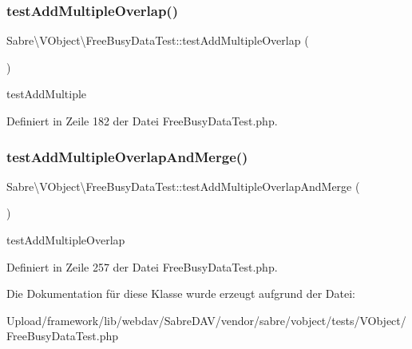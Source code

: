 \subsubsection{\texorpdfstring{test\+Add\+Multiple\+Overlap()}{testAddMultipleOverlap()}}
{\footnotesize\ttfamily Sabre\textbackslash{}\+V\+Object\textbackslash{}\+Free\+Busy\+Data\+Test\+::test\+Add\+Multiple\+Overlap (\begin{DoxyParamCaption}{ }\end{DoxyParamCaption})}

test\+Add\+Multiple 

Definiert in Zeile 182 der Datei Free\+Busy\+Data\+Test.\+php.

\mbox{\label{class_sabre_1_1_v_object_1_1_free_busy_data_test_aaa1aa5a2bc0a760e02a60130a226ebdb}} 
\subsubsection{\texorpdfstring{test\+Add\+Multiple\+Overlap\+And\+Merge()}{testAddMultipleOverlapAndMerge()}}
{\footnotesize\ttfamily Sabre\textbackslash{}\+V\+Object\textbackslash{}\+Free\+Busy\+Data\+Test\+::test\+Add\+Multiple\+Overlap\+And\+Merge (\begin{DoxyParamCaption}{ }\end{DoxyParamCaption})}

test\+Add\+Multiple\+Overlap 

Definiert in Zeile 257 der Datei Free\+Busy\+Data\+Test.\+php.



Die Dokumentation für diese Klasse wurde erzeugt aufgrund der Datei\+:\begin{DoxyCompactItemize}
\item 
Upload/framework/lib/webdav/\+Sabre\+D\+A\+V/vendor/sabre/vobject/tests/\+V\+Object/Free\+Busy\+Data\+Test.\+php\end{DoxyCompactItemize}
